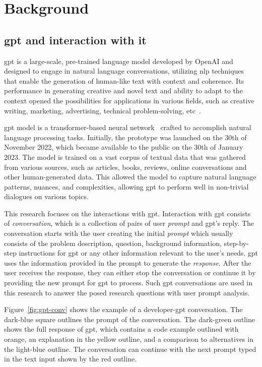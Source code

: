 \chapter{Background}
\section{\acrshort{gpt} and interaction with it}
\Acrfull{gpt} is a large-scale, pre-trained language model developed by OpenAI and designed to engage in natural language conversations, utilizing \acrfull{nlp} techniques that enable the generation of human-like text with context and coherence. Its performance in generating creative and novel text and ability to adapt to the context opened the possibilities for applications in various fields, such as creative writing, marketing, advertising, technical problem-solving, etc~\cite{fi15060192}.

\Acrshort{gpt} model is a transformer-based neural network~\cite{vaswani2017attention} crafted to accomplish natural language processing tasks. Initially, the prototype was launched on the 30th of November 2022, which became available to the public on the 30th of January 2023. The model is trained on a vast corpus of textual data that was gathered from various sources, such as articles, books, reviews, online conversations and other human-generated data. This allowed the model to capture natural language patterns, nuances, and complexities, allowing \acrshort{gpt} to perform well in non-trivial dialogues on various topics. 

This research focuses on the interactions with \acrshort{gpt}. Interaction with \acrshort{gpt} consists of \textit{conversation}, which is a collection of pairs of user \textit{prompt} and \acrshort{gpt}'s reply. The conversation starts with the user creating the initial \textit{prompt} which usually consists of the problem description, question, background information, step-by-step instructions for \acrshort{gpt} or any other information relevant to the user's needs. \Acrshort{gpt} uses the information provided in the prompt to generate the \textit{response}. After the user receives the response, they can either stop the conversation or continue it by providing the new prompt for \acrshort{gpt} to process. Such \acrshort{gpt} conversations are used in this research to answer the posed research questions with user prompt analysis.

Figure~\ref{fig:gpt-conv} shows the example of a developer-\acrshort{gpt} conversation. The dark-blue square outlines the prompt of the conversation. The dark-green outline shows the full response of \acrshort{gpt}, which contains a code example outlined with orange, an explanation in the yellow outline, and a comparison to alternatives in the light-blue outline. The conversation can continue with the next prompt typed in the text input shown by the red outline.

